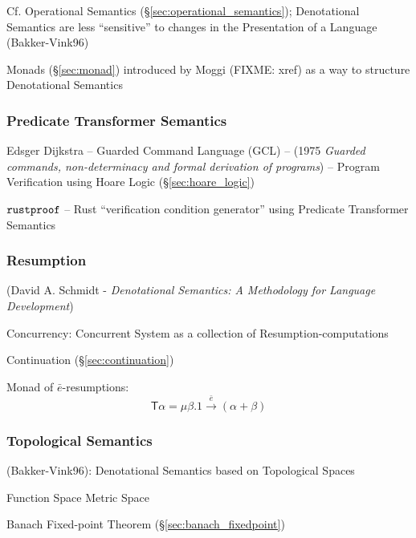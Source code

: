 \fist Cf. Operational Semantics (\S\ref{sec:operational_semantics});
Denotational Semantics are less ``sensitive'' to changes in the
Presentation of a Language (Bakker-Vink96) %

\fist Monads (\S\ref{sec:monad}) introduced by Moggi (FIXME: xref) as a way to
structure Denotational Semantics



\subsubsection{Predicate Transformer Semantics}
\label{sec:predicate_transformer_semantics}

Edsger Dijkstra -- Guarded Command Language (GCL) -- (1975
\emph{Guarded commands, non-determinacy and formal derivation of
  programs}) -- Program Verification using Hoare Logic
(\S\ref{sec:hoare_logic})

$\mathtt{rustproof}$ -- Rust ``verification condition generator'' using
Predicate Transformer Semantics



\subsubsection{Resumption}\label{sec:resumption}

(David A. Schmidt - \emph{Denotational Semantics: A Methodology for
  Language Development}) %

Concurrency: Concurrent System as a collection of
Resumption-computations \cite{filinski99}

Continuation (\S\ref{sec:continuation})

Monad of $\bar{e}$-resumptions: \cite{filinski99} %
\[
  \mathsf{T}\alpha = \mu \beta. 1 \xrightarrow{\bar{e}} (\alpha + \beta)
\]



\subsubsection{Topological Semantics}\label{sec:topological_semantics}

(Bakker-Vink96): Denotational Semantics based on Topological Spaces

Function Space Metric Space %

Banach Fixed-point Theorem (\S\ref{sec:banach_fixedpoint})



